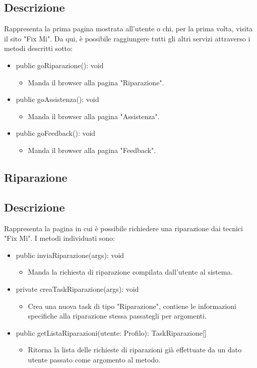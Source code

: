 \documentclass{report}
\begin{document}
\subsection*{Descrizione}
Rappresenta la prima pagina mostrata all'utente o chi, per la prima volta, visita il sito "Fix Mi". Da qui, è possibile raggiungere tutti gli altri servizi attraverso i metodi descritti sotto:
\begin{itemize}
	\item public goRiparazione(): void
	\begin{itemize}
		\item Manda il browser alla pagina "Riparazione".
	\end{itemize}
	\item public goAssistenza(): void
	\begin{itemize}
		\item Manda il browser alla pagina "Assistenza".
	\end{itemize}
	\item public goFeedback(): void
	\begin{itemize}
		\item Manda il browser alla pagina "Feedback".
	\end{itemize}
\end{itemize}

\subsection*{Riparazione}
\subsection*{Descrizione}
Rappresenta la pagina in cui è possibile richiedere una riparazione dai tecnici "Fix Mi". I metodi individuati sono:
\begin{itemize}
	\item public inviaRiparazione(args): void
	\begin{itemize}
		\item Manda la richiesta di riparazione compilata dall'utente al sistema.
	\end{itemize}
	\item private creaTaskRiparazione(args): void
	\begin{itemize}
		\item Crea una nuova task di tipo "Riparazione", contiene le informazioni specifiche alla riparazione stessa passategli per argomenti.
	\end{itemize}
	\item public getListaRiparazioni(utente: Profilo): TaskRiparazione[]
	\begin{itemize}
		\item Ritorna la lista delle richieste di riparazioni già effettuate da un dato utente passato come argomento al metodo.
	\end{itemize}
\end{itemize}
\end{document}
